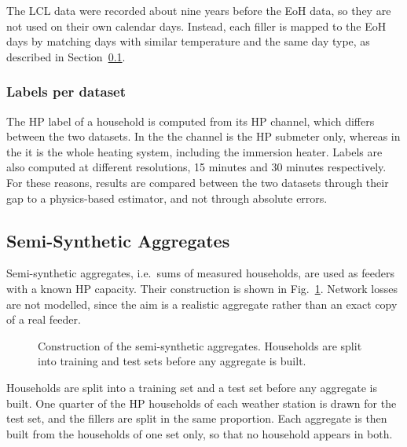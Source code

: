 The LCL data were recorded about nine years before the EoH data, so they are not used on their own calendar days. Instead, each filler is mapped to the EoH days by matching days with similar temperature and the same day type, as described in Section~\ref{sec:aggregates}.

\subsubsection{Labels per dataset}
The HP label of a household is computed from its HP channel, which differs between the two datasets. In the \dataCH{} the channel is the HP submeter only, whereas in the \dataGB{} it is the whole heating system, including the immersion heater. Labels are also computed at different resolutions, 15 minutes and 30 minutes respectively. For these reasons, results are compared between the two datasets through their gap to a physics-based estimator, and not through absolute errors.

\subsection{Semi-Synthetic Aggregates}
\label{sec:aggregates}

Semi-synthetic aggregates, i.e.\ sums of measured households, are used as feeders with a known HP capacity. Their construction is shown in Fig.~\ref{fig:design}. Network losses are not modelled, since the aim is a realistic aggregate rather than an exact copy of a real feeder.

\begin{figure}[t]
\centering
{}
\caption{Construction of the semi-synthetic aggregates. Households are split into training and test sets before any aggregate is built.}
\label{fig:design}
\end{figure}

Households are split into a training set and a test set before any aggregate is built. One quarter of the HP households of each weather station is drawn for the test set, and the fillers are split in the same proportion. Each aggregate is then built from the households of one set only, so that no household appears in both.

